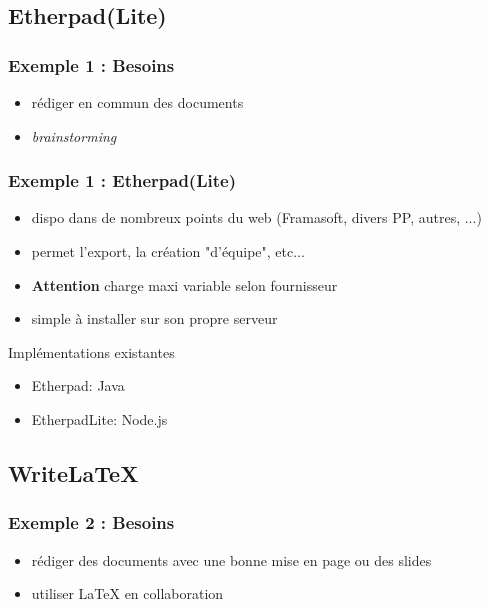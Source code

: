 \documentclass{beamer}
\begin{document}
\subsection{Etherpad(Lite)} %

\begin{frame}
    \frametitle{Exemple 1 : Besoins}

    \begin{itemize}
        \item rédiger en commun des documents
        \item \textit{brainstorming}
    \end{itemize}

\end{frame}


\begin{frame}
    \frametitle{Exemple 1 : Etherpad(Lite)}

    \begin{itemize}
        \item dispo dans de nombreux points du web (Framasoft, divers PP, autres, ...)
        \item permet l'export, la création "d'équipe", etc...
        \item \textbf{Attention} charge maxi variable selon fournisseur
        \item simple à installer sur son propre serveur
    \end{itemize}

    \begin{block}{Implémentations existantes}
        \begin{itemize}
            \item Etherpad: Java
            \item EtherpadLite: Node.js
        \end{itemize}
    \end{block}


\end{frame}

\subsection{Write\LaTeX} %

\begin{frame}
    \frametitle{Exemple 2 : Besoins}

    \begin{itemize}
        \item rédiger des documents avec une bonne mise en page ou des slides
        \item utiliser \LaTeX{} en collaboration
    \end{itemize}

\end{frame}
\end{document}
